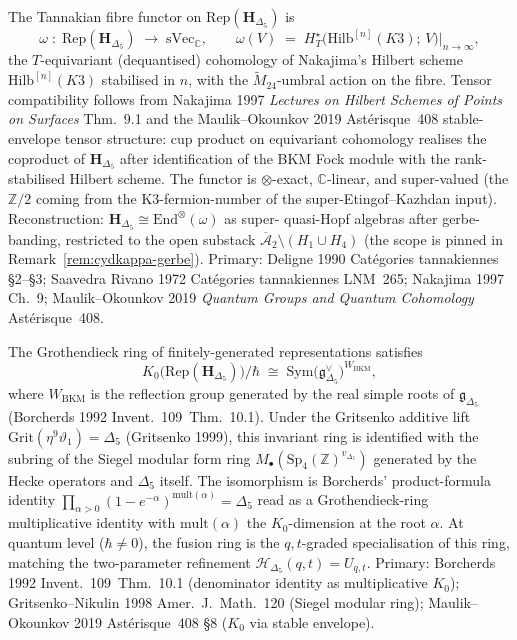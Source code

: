 \begin{remark}
\label{rem:cydkappa-fibre-functor}
The Tannakian fibre functor on $\mathrm{Rep}(\mathbf H_{\Delta_5})$ is
\[
 \omega\;:\;\mathrm{Rep}(\mathbf H_{\Delta_5})\;\longrightarrow\;
 \mathrm{sVec}_{\mathbb{C}},\qquad
 \omega(V)\;=\;H^\star_{T}\bigl(\mathrm{Hilb}^{[n]}(K3);\,V\bigr)\big|_{n\to\infty},
\]
the $T$-equivariant (dequantised) cohomology of Nakajima's Hilbert
scheme $\mathrm{Hilb}^{[n]}(K3)$ stabilised in $n$, with the
$\widetilde{M}_{24}$-umbral action on the fibre. Tensor compatibility
follows from Nakajima 1997 \emph{Lectures on Hilbert Schemes of Points
on Surfaces} Thm.~9.1 and the Maulik--Okounkov 2019 Ast\'erisque~408
stable-envelope tensor structure: cup product on equivariant
cohomology realises the coproduct of $\mathbf H_{\Delta_5}$ after
identification of the BKM Fock module with the rank-stabilised Hilbert
scheme. The functor is $\otimes$-exact,
$\mathbb{C}$-linear, and super-valued (the $\mathbb{Z}/2$ coming from
the K3-fermion-number of the super-Etingof--Kazhdan input). Reconstruction:
$\mathbf{H}_{\Delta_5} \cong \mathrm{End}^{\otimes}(\omega)$ as super-
quasi-Hopf algebras after gerbe-banding, restricted to the open
substack
$\overline{\mathcal A}_2 \setminus (H_1 \cup H_4)$
(the scope is pinned in
Remark~\ref{rem:cydkappa-gerbe}). Primary:
Deligne 1990 Cat\'egories tannakiennes \S2--\S3; Saavedra Rivano 1972
Cat\'egories tannakiennes LNM~265; Nakajima 1997 Ch.~9;
Maulik--Okounkov 2019 \emph{Quantum Groups and Quantum Cohomology}
Ast\'erisque~408.
\end{remark}

\begin{remark}
\label{rem:cydkappa-grothendieck}
The Grothendieck ring of finitely-generated representations satisfies
\[
 K_0\bigl(\mathrm{Rep}(\mathbf H_{\Delta_5})\bigr)\!\big/\hbar
 \;\cong\;
 \mathrm{Sym}\bigl(\mathfrak{g}_{\Delta_5}^\vee\bigr)^{W_{\mathrm{BKM}}},
\]
where $W_{\mathrm{BKM}}$ is the reflection group generated by the
real simple roots of $\mathfrak g_{\Delta_5}$ (Borcherds 1992
Invent.~109~Thm.~10.1). Under the Gritsenko additive lift
$\mathrm{Grit}(\eta^9\vartheta_1)=\Delta_5$ (Gritsenko 1999), this
invariant ring is identified with the subring of the Siegel modular
form ring $M_\bullet(\mathrm{Sp}_4(\mathbb Z)^{v_{\Delta_5}})$
generated by the Hecke operators and $\Delta_5$ itself. The
isomorphism is Borcherds' product-formula identity
$\prod_{\alpha>0}(1-e^{-\alpha})^{\mathrm{mult}(\alpha)} = \Delta_5$
read as a Grothendieck-ring multiplicative identity with
$\mathrm{mult}(\alpha)$ the $K_0$-dimension at the root $\alpha$.
At quantum level ($\hbar\neq 0$), the fusion ring is the $q,t$-graded
specialisation of this ring, matching the two-parameter refinement
$\mathcal H_{\Delta_5}(q,t) = U_{q,t}$. Primary: Borcherds 1992
Invent.~109~Thm.~10.1 (denominator identity as multiplicative $K_0$);
Gritsenko--Nikulin 1998 Amer.~J.~Math.~120 (Siegel modular ring);
Maulik--Okounkov 2019 Ast\'erisque~408 \S8 ($K_0$ via stable envelope).
\end{remark}

